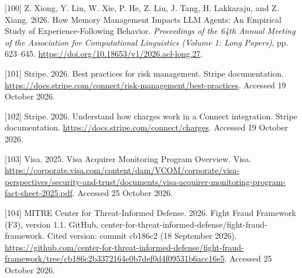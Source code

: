 \documentclass[
  11pt,
]{article}
\newlength{\cslhangindent}
\newlength{\cslentryspacingunit} %
\newenvironment{CSLReferences}[2] %
 {%
  \setlength{\parindent}{0pt}
  \ifodd #1
  \let\oldpar\par
  \def\par{\hangindent=\cslhangindent\oldpar}
  \fi
  \setlength{\parskip}{#2\cslentryspacingunit}
 }%
 {}
\begin{document}
\begin{CSLReferences}{1}{1}
\leavevmode{}%
{[}100{]} Z. Xiong, Y. Lin, W. Xie, P. He, Z. Liu, J. Tang, H.
Lakkaraju, and Z. Xiang. 2026. How Memory Management Impacts LLM Agents:
An Empirical Study of Experience-Following Behavior. \emph{Proceedings
of the 64th Annual Meeting of the Association for Computational
Linguistics (Volume 1: Long Papers)}, pp. 623--645.
\url{https://doi.org/10.18653/v1/2026.acl-long.27}.

\leavevmode{}%
{[}101{]} Stripe. 2026. Best practices for risk management. Stripe
documentation.
\url{https://docs.stripe.com/connect/risk-management/best-practices}.
Accessed 19 October 2026.

\leavevmode{}%
{[}102{]} Stripe. 2026. Understand how charges work in a Connect
integration. Stripe documentation.
\url{https://docs.stripe.com/connect/charges}. Accessed 19 October 2026.

\leavevmode{}%
{[}103{]} Visa. 2025. Visa Acquirer Monitoring Program Overview. Visa.
\url{https://corporate.visa.com/content/dam/VCOM/corporate/visa-perspectives/security-and-trust/documents/visa-acquirer-monitoring-program-fact-sheet-2025.pdf}.
Accessed 25 October 2026.

\leavevmode{}%
{[}104{]} MITRE Center for Threat-Informed Defense. 2026. Fight Fraud
Framework (F3), version 1.1. GitHub,
center-for-threat-informed-defense/fight-fraud-framework. Cited version:
commit cb186c2 (18 September 2026).
\url{https://github.com/center-for-threat-informed-defense/fight-fraud-framework/tree/cb186c2b3372164e0b7def0d4f09531b6acc16e5}.
Accessed 25 October 2026.

\end{CSLReferences}
\end{document}
